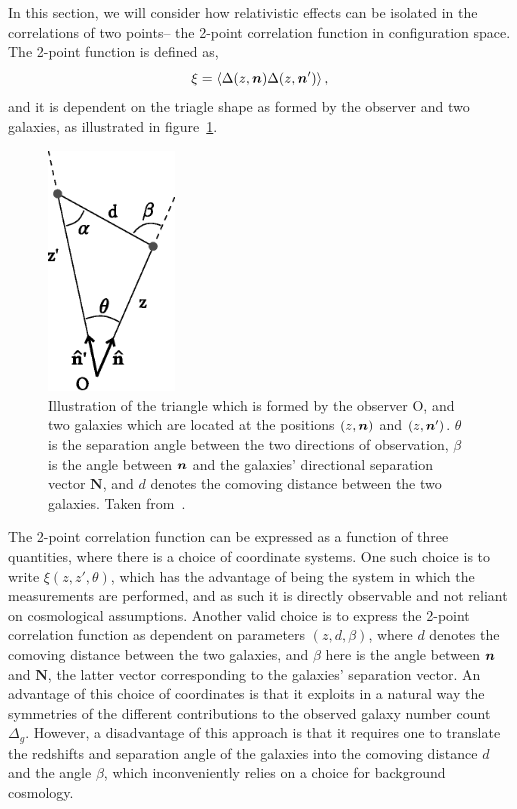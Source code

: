 In this section, we will consider how relativistic effects can be isolated in the correlations of two points-- the 2-point correlation function in configuration space. The 2-point function is defined as, 
\begin{equation}
	\xi = \langle \Delta(z,\bm {n}) \Delta(z, \bm {n}') \rangle\,,
\end{equation}
and it is dependent on the triagle shape as formed by the observer and two galaxies, as illustrated in figure~\ref{fig:2ptcorr_triangle_bonvin}. 
\begin{figure}[ht]
	\centering
	\includegraphics[width=0.3\textwidth]{fig/bonvin_triangle2pt.eps}
	\caption{Illustration of the triangle which is formed by the observer O, and two galaxies which are located at the positions $(z,\bm {n})$ and $(z,\bm {n}')$. $\theta$ is the separation angle between the two directions of observation, $\beta$ is the angle between $\bm {n}$ and the galaxies' directional separation vector $\bm{N}$, and $d$ denotes the comoving distance between the two galaxies. Taken from~\cite{Bonvin:2014owa}.}
	\label{fig:2ptcorr_triangle_bonvin}
\end{figure}
The 2-point correlation function can be expressed as a function of three quantities, where there is a choice of coordinate systems. One such choice is to write $\xi(z, z', \theta)$, which has the advantage of being the system in which the measurements are performed, and as such it is directly observable and not reliant on cosmological assumptions. Another valid choice is to express the 2-point correlation function as dependent on parameters $(z,d,\beta)$, where $d$ denotes the comoving distance between the two galaxies, and $\beta$ here is the angle between $\bm {n}$ and $\bm{N}$, the latter vector corresponding to the galaxies' separation vector. An advantage of this choice of coordinates is that it exploits in a natural way the symmetries of the different contributions to the observed galaxy number count $\Delta_g$. However, a disadvantage of this approach is that it requires one to translate the redshifts and separation angle of the galaxies into the comoving distance $d$ and the angle $\beta$, which inconveniently relies on a choice for background cosmology. 

